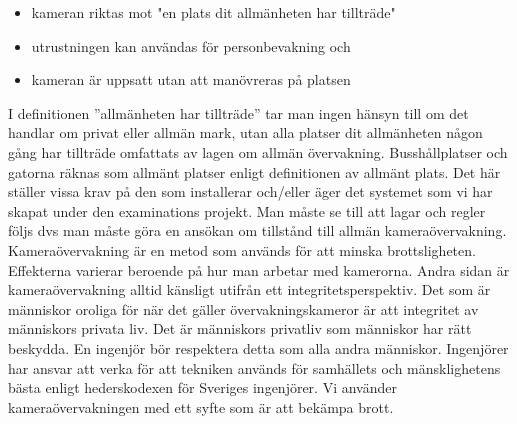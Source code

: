 \begin{itemize}
\item kameran riktas mot "en plats dit allmänheten har tillträde"

\item utrustningen kan användas för personbevakning och

\item kameran är uppsatt utan att manövreras på platsen
\end{itemize}
I definitionen ”allmänheten har tillträde” tar man ingen hänsyn till om det handlar om privat eller allmän mark, utan alla platser dit allmänheten någon gång har tillträde omfattats av lagen om allmän övervakning. Busshållplatser och gatorna räknas som allmänt platser enligt definitionen av allmänt plats.  Det här ställer vissa krav på den som installerar och/eller äger det systemet som vi har skapat under den examinations projekt. Man måste se till att lagar och regler följs dvs man måste göra en ansökan om tillstånd till allmän kameraövervakning. 
Kameraövervakning är en metod som används för att minska brottsligheten. Effekterna varierar beroende på hur man arbetar med kamerorna. Andra sidan är kameraövervakning alltid känsligt utifrån ett integritetsperspektiv. Det som är människor oroliga för när det gäller övervakningskameror är att integritet av människors privata liv.  Det är människors privatliv som människor har rätt beskydda. En ingenjör bör respektera detta som alla andra människor. Ingenjörer har ansvar att verka för att tekniken används för samhällets och mänsklighetens bästa enligt hederskodexen för Sveriges ingenjörer\cite{sverige}. Vi använder kameraövervakningen med ett syfte som är att bekämpa brott. 




